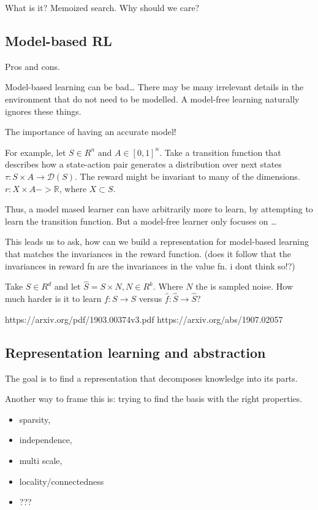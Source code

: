 What is it? Memoized search. Why should we care?

\hypertarget{model-based-rl}{%
\subsection{Model-based RL}\label{model-based-rl}}

Pros and cons.

Model-based learning can be bad\ldots{} There may be many irrelevant
details in the environment that do not need to be modelled. A model-free
learning naturally ignores these things.

The importance of having an accurate model!

For example, let \(S\in R^n\) and \(A\in [0, 1]^n\). Take a transition
function that describes how a state-action pair generates a distribution
over next states \(\tau: S \times A \to \mathcal D(S)\). The reward
might be invariant to many of the dimensions.
\(r: X \times A -> \mathbb R\), where \(X \subset S\).

Thus, a model mased learner can have arbitrarily more to learn, by
attempting to learn the transition function. But a model-free learner
only focuses on \ldots{}

This leads us to ask, how can we build a representation for model-based
learning that matches the invariances in the reward function. (does it
follow that the invariances in reward fn are the invariances in the
value fn. i dont think so!?)

Take \(S \in R^d\) and let \(\hat S = S \times N, N \in R^k\). Where
\(N\) the is sampled noise. How much harder is it to learn
\(f: S \to S\) versus \(\hat f: \hat S \to \hat S\)?

https://arxiv.org/pdf/1903.00374v3.pdf https://arxiv.org/abs/1907.02057

\hypertarget{representation-learning-and-abstraction}{%
\subsection{Representation learning and
abstraction}\label{representation-learning-and-abstraction}}

The goal is to find a representation that decomposes knowledge into its
parts.

Another way to frame this is: trying to find the basis with the right
properties.

\begin{itemize}
\tightlist
\item
  sparsity,
\item
  independence,
\item
  multi scale,
\item
  locality/connectedness
\item
  ???
\end{itemize}


